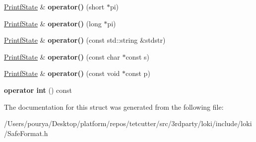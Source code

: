 \begin{DoxyCompactItemize}
\item 
\hypertarget{structLoki_1_1PrintfState_a7f0706bdbbc86e0da44f3385b142d715}{}\hyperlink{structLoki_1_1PrintfState}{Printf\+State} \& {\bfseries operator()} (short $\ast$pi)\label{structLoki_1_1PrintfState_a7f0706bdbbc86e0da44f3385b142d715}

\item 
\hypertarget{structLoki_1_1PrintfState_afbbda5b12b9bf5881716aa18e97c77b4}{}\hyperlink{structLoki_1_1PrintfState}{Printf\+State} \& {\bfseries operator()} (long $\ast$pi)\label{structLoki_1_1PrintfState_afbbda5b12b9bf5881716aa18e97c77b4}

\item 
\hypertarget{structLoki_1_1PrintfState_ab604f3d139ecec73f1358f4bd3444a5d}{}\hyperlink{structLoki_1_1PrintfState}{Printf\+State} \& {\bfseries operator()} (const std\+::string \&stdstr)\label{structLoki_1_1PrintfState_ab604f3d139ecec73f1358f4bd3444a5d}

\item 
\hypertarget{structLoki_1_1PrintfState_aaf835f63313b4c9778c072f067d34b9e}{}\hyperlink{structLoki_1_1PrintfState}{Printf\+State} \& {\bfseries operator()} (const char $\ast$const s)\label{structLoki_1_1PrintfState_aaf835f63313b4c9778c072f067d34b9e}

\item 
\hypertarget{structLoki_1_1PrintfState_a20c9da232d3e16a8758bd9bcb627557d}{}\hyperlink{structLoki_1_1PrintfState}{Printf\+State} \& {\bfseries operator()} (const void $\ast$const p)\label{structLoki_1_1PrintfState_a20c9da232d3e16a8758bd9bcb627557d}

\item 
\hypertarget{structLoki_1_1PrintfState_a7a6139e9b2508eb0f585d1128787636c}{}{\bfseries operator int} () const \label{structLoki_1_1PrintfState_a7a6139e9b2508eb0f585d1128787636c}

\end{DoxyCompactItemize}


The documentation for this struct was generated from the following file\+:\begin{DoxyCompactItemize}
\item 
/\+Users/pourya/\+Desktop/platform/repos/tetcutter/src/3rdparty/loki/include/loki/Safe\+Format.\+h\end{DoxyCompactItemize}
